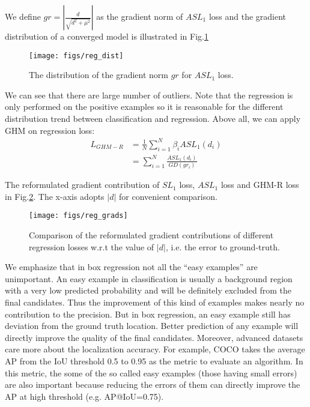 \documentclass[letterpaper]{article} \usepackage{aaai19}  \usepackage{times}  \usepackage{helvet}  \usepackage{courier}  \usepackage{url}  \usepackage{graphicx}  \usepackage{amsmath,amssymb}
\begin{document}
We define $gr = |\frac{d}{\sqrt{d^2 + \mu^2}}|$ as the gradient norm of $ASL_1$ loss and the gradient distribution of a converged model is illustrated in Fig.\ref{fig:reg_dist}
\begin{figure}[ht]
\centering
\texttt{[image: figs/reg\_dist]}
\caption{The distribution of the gradient norm $gr$ for $ASL_1$ loss.}
\label{fig:reg_dist}
\end{figure}
We can see that there are large number of outliers. Note that the regression is only performed on the positive examples so it is reasonable for the different distribution trend between classification and regression. Above all, we can apply  GHM on regression loss:
\begin{equation}
\label{eq:ghm-r}
    \begin{aligned}
    L_{GHM-R} &= \frac{1}{N}\sum_{i=1}^N\beta_i ASL_1(d_i) \\
    &= \sum_{i=1}^N\frac{ASL_1(d_i)}{GD(gr_i)}
    \end{aligned}
\end{equation}

The reformulated gradient contribution of $SL_1$ loss, $ASL_1$ loss and GHM-R loss in Fig.\ref{fig:reg_grads}. The x-axis adopts $|d|$ for convenient comparison.
\begin{figure}[ht]
\centering
\texttt{[image: figs/reg\_grads]}
\caption{Comparison of the reformulated gradient contributions of different regression losses w.r.t the value of $|d|$, i.e. the error to ground-truth.}
\label{fig:reg_grads}
\end{figure}

We emphasize that in box regression not all the ``easy examples'' are unimportant. An easy example in classification is usually a background region with a very low predicted probability and will be definitely excluded from the final candidates. Thus the improvement of this kind of examples makes nearly no contribution to the precision. But in box regression, an easy example still has deviation from the ground truth location. Better prediction of any example will directly improve the quality of the final candidates. 
Moreover, advanced datasets care more about the localization accuracy. For example, COCO \cite{coco} takes the average AP from the IoU threshold 0.5 to 0.95 as the metric to evaluate an algorithm. In this metric, the some of the so called easy examples (those having small errors) are also important because reducing the errors of them can directly improve the AP at high threshold (e.g. AP@IoU=0.75). 
\end{document}
